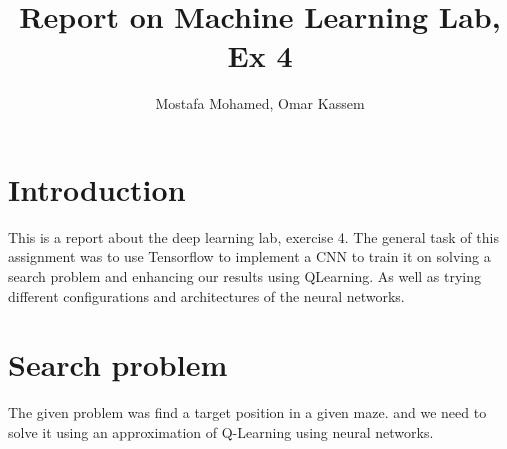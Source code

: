 \documentclass[a4paper]{article}
\begin{document}

\title{Report on Machine Learning Lab, Ex 4} %


\author{Mostafa Mohamed, Omar Kassem}%



\maketitle %




\section{Introduction}
This is a report about the deep learning lab, exercise 4. The general task of this assignment was to use Tensorflow to implement a CNN to train it on solving a search problem and enhancing our results using QLearning. As well as trying different configurations and architectures of the neural networks.

\section{Search problem}
The given problem was find a target position in a given maze. and we need to solve it using an approximation of Q-Learning using neural networks.
\end{document}
